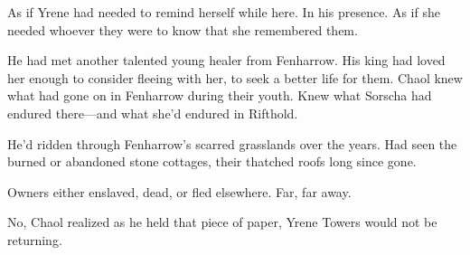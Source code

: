 As if Yrene had needed to remind herself while here.
In his presence.
As if she needed whoever they were to know that she remembered them.

He had met another talented young healer from Fenharrow.
His king had loved her enough to consider fleeing with her, to seek a better life for them.
Chaol knew what had gone on in Fenharrow during their youth.
Knew what Sorscha had endured there---and what she'd endured in Rifthold.

He'd ridden through Fenharrow's scarred grasslands over the years.
Had seen the burned or abandoned stone cottages, their thatched roofs long since gone.

Owners either enslaved, dead, or fled elsewhere.
Far, far away.

No, Chaol realized as he held that piece of paper, Yrene Towers would not be returning.

